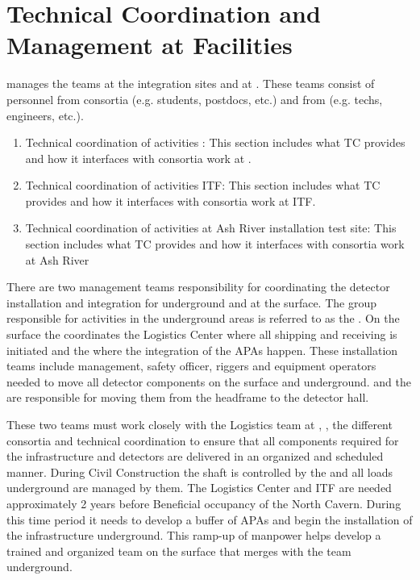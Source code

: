 \chapter{Technical Coordination and Management at Facilities}
\label{vl:tc-facility_mgmt}

  manages the teams at the integration sites and
at \surf. These teams consist of personnel from consortia
(e.g. students, postdocs, etc.) and from  (e.g. techs,
engineers, etc.).
\begin{enumerate}
 \item Technical coordination of activities \surf: This section
   includes what TC provides and how it interfaces with consortia work
   at \surf.
 \item Technical coordination of activities ITF: This section includes
   what TC provides and how it interfaces with consortia work at ITF.
 \item Technical coordination of activities at Ash River installation
   test site: This section includes what TC provides and how it
   interfaces with consortia work at Ash River 
\end{enumerate}



There are two management teams responsibility for coordinating the
detector installation and integration for underground and at the
surface. The group responsible for activities in the underground areas
is referred to as the .  On the
surface the  coordinates the Logistics
Center where all  shipping and receiving is initiated and the
 where the integration of the
APAs happen.  These installation teams include management, safety
officer, riggers and equipment operators needed to move all detector
components on the surface and underground. \surf and the  are
responsible for moving them from the headframe to the detector hall.

These two teams must work closely with the  Logistics team at
\surf, , the different consortia and technical coordination to
ensure that all components required for the infrastructure and
detectors are delivered in an organized and scheduled manner. During
Civil Construction the shaft is controlled by the  and all loads
underground are managed by them.  The Logistics Center and ITF are
needed approximately 2 years before Beneficial occupancy of the North
Cavern.  During this time period it needs to develop a buffer of APAs
and begin the installation of the infrastructure underground. This
ramp-up of manpower helps develop a trained and organized team on the
surface that merges with the team underground.

